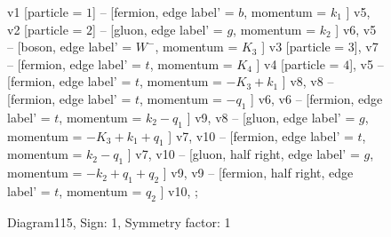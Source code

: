 \documentclass{revtex4}
\begin{document}
\begin{figure}[!htb]
\begin{center}
{    %
v1 [particle = \(1\)] -- [fermion, edge label' = \(b\), momentum = \(k_{1}\) ] v5, 
v2 [particle = \(2\)] -- [gluon, edge label' = \(g\), momentum = \(k_{2}\) ] v6, 
v5 -- [boson, edge label' = \(W^{-}\), momentum = \(K_{3}\) ] v3 [particle = \(3\)], 
v7 -- [fermion, edge label' = \(t\), momentum = \(K_{4}\) ] v4 [particle = \(4\)], 
v5 -- [fermion, edge label' = \(t\), momentum = \(-K_{3} + k_{1}\) ] v8, 
v8 -- [fermion, edge label' = \(t\), momentum = \(-q_{1}\) ] v6, 
v6 -- [fermion, edge label' = \(t\), momentum = \(k_{2} - q_{1}\) ] v9, 
v8 -- [gluon, edge label' = \(g\), momentum = \(-K_{3} + k_{1} + q_{1}\) ] v7, 
v10 -- [fermion, edge label' = \(t\), momentum = \(k_{2} - q_{1}\) ] v7, 
v10 -- [gluon, half right, edge label' = \(g\), momentum = \(-k_{2} + q_{1} + q_{2}\) ] v9, 
v9 -- [fermion, half right, edge label' = \(t\), momentum = \(q_{2}\) ] v10, 
};
\end{center}
\caption{Diagram115, Sign: 1, Symmetry factor: 1}
\end{figure}
\newpage
\end{document}
